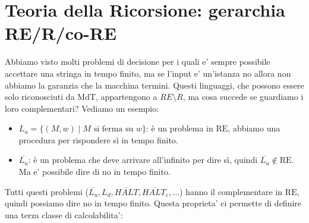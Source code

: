 
 
\section{Teoria della Ricorsione: gerarchia RE/R/co-RE}

Abbiamo visto molti problemi di decisione per i quali e' sempre possibile accettare una stringa in tempo finito, ma se l'input e' un'istanza no allora non abbiamo la garanzia che la macchina termini. Questi linguaggi, che possono essere solo riconosciuti da MdT, appartengono a $ RE \setminus R $, ma cosa succede se guardiamo i loro complementari? Vediamo un esempio:
\begin{itemize}
  \item $L_u = \{(M,w) \mid M \text{ si ferma su } w\}$: è un problema in $\mathrm{RE}$,
        abbiamo una procedura per rispondere sì in tempo finito.
  \item $\overline{L_u}$: è un problema che deve arrivare all'infinito per dire sì,
    quindi $\overline{L_u} \notin \mathrm{RE}$. Ma e' possibile dire di no in tempo finito.
\end{itemize}
 
Tutti questi problemi ($ \overline{L_u}, L_d, \overline{HALT}, \overline{HALT_\varepsilon},... $) hanno il complementare in $\mathrm{RE}$, quindi possiamo dire no in tempo finito. Questa proprieta' ci permette di definire una terza classe di calcolabilita':
 
